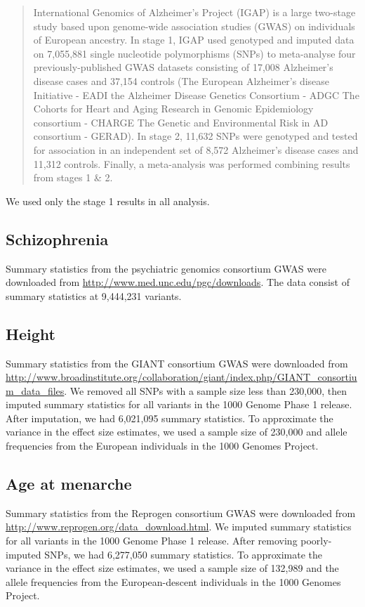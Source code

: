 \documentclass[11pt,titlepage]{article}
\begin{document}
\begin{quote}
International Genomics of Alzheimer's Project (IGAP) is a large two-stage study based upon genome-wide association studies (GWAS) on individuals of European ancestry. In stage 1, IGAP used genotyped and imputed data on 7,055,881 single nucleotide polymorphisms (SNPs) to meta-analyse four previously-published GWAS datasets consisting of 17,008 Alzheimer's disease cases and 37,154 controls (The European Alzheimer's disease Initiative - EADI the Alzheimer Disease Genetics Consortium - ADGC The Cohorts for Heart and Aging Research in Genomic Epidemiology consortium - CHARGE The Genetic and Environmental Risk in AD consortium - GERAD). In stage 2, 11,632 SNPs were genotyped and tested for association in an independent set of 8,572 Alzheimer's disease cases and 11,312 controls. Finally, a meta-analysis was performed combining results from stages 1 \& 2.
\end{quote}

We used only the stage 1 results in all analysis. 

\subsection{Schizophrenia}
Summary statistics from the psychiatric genomics consortium GWAS \citep{Schizophrenia-Working-Group-of-the-Psychiatric-Genomics-Consortium:2014aa} were downloaded from \url{http://www.med.unc.edu/pgc/downloads}. The data consist of summary statistics at 9,444,231 variants.

\subsection{Height}
Summary statistics from the GIANT consortium GWAS \citep{Wood:2014aa} were downloaded from \url{http://www.broadinstitute.org/collaboration/giant/index.php/GIANT_consortium_data_files}. We removed all SNPs with a sample size less than 230,000, then imputed summary statistics for all variants in the 1000 Genome Phase 1 release. After imputation, we had 6,021,095 summary statistics. To approximate the variance in the effect size estimates, we used a sample size of 230,000 and allele frequencies from the European individuals in the 1000 Genomes Project.

\subsection{Age at menarche}
Summary statistics from the Reprogen consortium GWAS \citep{Perry:2014aa} were downloaded from \url{http://www.reprogen.org/data_download.html}. We imputed summary statistics for all variants in the 1000 Genome Phase 1 release. After removing poorly-imputed SNPs, we had 6,277,050 summary statistics. To approximate the variance in the effect size estimates, we used a sample size of 132,989 and the allele frequencies from the European-descent individuals in the 1000 Genomes Project. 
\end{document}
